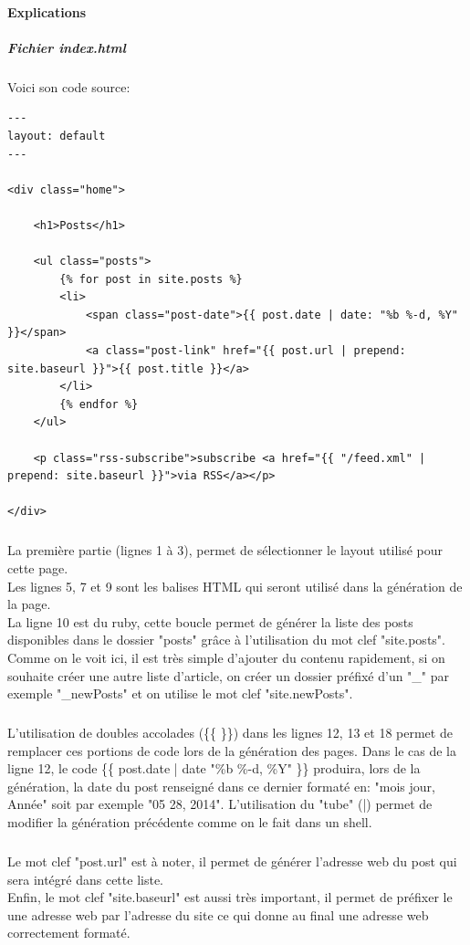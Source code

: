 \documentclass[11pt,a4paper,twoside]{report}
\begin{document}
			\paragraph{Explications}
				\subparagraph{Fichier index.html}Voici son code source:
					\begin{lstlisting}
---
layout: default
---

<div class="home">

	<h1>Posts</h1>

	<ul class="posts">
		{% for post in site.posts %}
		<li>
			<span class="post-date">{{ post.date | date: "%b %-d, %Y" }}</span>
			<a class="post-link" href="{{ post.url | prepend: site.baseurl }}">{{ post.title }}</a>
		</li>
		{% endfor %}
	</ul>

	<p class="rss-subscribe">subscribe <a href="{{ "/feed.xml" | prepend: site.baseurl }}">via RSS</a></p>

</div>
					\end{lstlisting}
				\subparagraph*{}La première partie (lignes 1 à 3), permet de sélectionner le layout utilisé pour cette page.\\
				Les lignes 5, 7 et 9 sont les balises HTML qui seront utilisé dans la génération de la page.\\
				La ligne 10 est du ruby, cette boucle permet de générer la liste des posts disponibles dans le dossier "posts" grâce à l'utilisation du mot clef "site.posts". Comme on le voit ici, il est très simple d'ajouter du contenu rapidement, si on souhaite créer une autre liste d'article, on créer un dossier préfixé d'un "\_" par exemple "\_newPosts" et on utilise le mot clef "site.newPosts".
				\subparagraph*{}L'utilisation de doubles accolades (\{\{ \}\}) dans les lignes 12, 13 et 18 permet de remplacer ces portions de code lors de la génération des pages. Dans le cas de la ligne 12, le code \{\{ post.date | date "\%b \%-d, \%Y" \}\} produira, lors de la génération, la date du post renseigné dans ce dernier formaté en: "mois jour, Année" soit par exemple "05 28, 2014". L'utilisation du "tube" (|) permet de modifier la génération précédente comme on le fait dans un shell.
				\subparagraph*{}Le mot clef "post.url" est à noter, il permet de générer l'adresse web du post qui sera intégré dans cette liste.\\
				Enfin, le mot clef "site.baseurl" est aussi très important, il permet de préfixer le une adresse web par l'adresse du site ce qui donne au final une adresse web correctement formaté.
\end{document}
